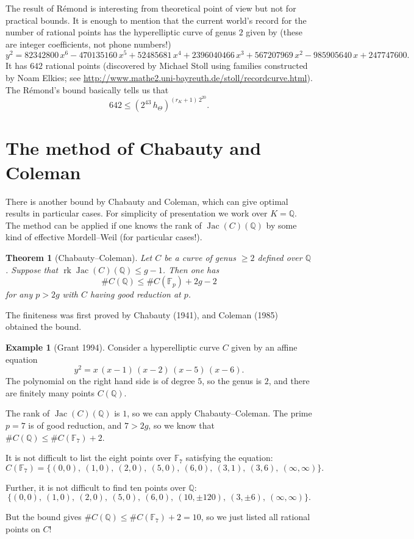 \documentclass{article}
\newtheorem{theorem}[proposition]{Theorem}
\theoremstyle{definition}
\newtheorem{example}[proposition]{Example}
\DeclareMathOperator{\rk}{rk}
\DeclareMathOperator{\Jac}{Jac}
\newcommand{\FF}{\mathbb{F}}
\newcommand{\QQ}{\mathbb{Q}}
\begin{document}
The result of R\'emond is interesting from theoretical point of view but not for
practical bounds. It is enough to mention that the current world's record for
the number of rational points has the hyperelliptic curve of genus $2$ given by
(these are integer coefficients, not phone numbers!)
$$y^2 = 82342800\,x^6 - 470135160\,x^5 + 52485681\,x^4 + 2396040466\,x^3 + 567207969\,x^2 - 985905640\,x + 247747600.$$
It has $642$ rational points (discovered by Michael Stoll using families
constructed by Noam Elkies; see
\url{http://www.mathe2.uni-bayreuth.de/stoll/recordcurve.html}).  The R\'emond's
bound basically tells us that
$$642 \le (2^{43}\,h_\Theta)^{(r_K+1)\,2^{20}}.$$

\section{The method of Chabauty and Coleman}

There is another bound by Chabauty and Coleman, which can give optimal results
in particular cases. For simplicity of presentation we work over $K = \QQ$. The
method can be applied if one knows the rank of $\Jac (C) (\QQ)$ by some kind of
effective Mordell--Weil (for particular cases!).

\begin{theorem}[Chabauty--Coleman]
  Let $C$ be a curve of genus $\ge 2$ defined over $\QQ$. Suppose that
  $\rk \Jac (C) (\QQ) \le g-1$. Then one has
  $$\# C (\QQ) \le \# C (\FF_p) + 2g - 2$$
  for any $p > 2g$ with $C$ having good reduction at $p$.
\end{theorem}

The finiteness was first proved by Chabauty (1941), and Coleman (1985) obtained
the bound.

\begin{example}[Grant 1994]
  Consider a hyperelliptic curve $C$ given by an affine equation
  $$y^2 = x\,(x-1)\,(x-2)\,(x-5)\,(x-6).$$
  The polynomial on the right hand side is of degree $5$, so the genus is $2$,
  and there are finitely many points $C (\QQ)$.

  The rank of $\Jac (C) (\QQ)$ is $1$, so we can apply Chabauty--Coleman. The
  prime $p = 7$ is of good reduction, and $7 > 2g$, so we know that
  $\# C (\QQ) \le \# C (\FF_7) + 2$.

  It is not difficult to list the eight points over $\FF_7$ satisfying the
  equation:
  $$C (\FF_7) = \{ (0,0), ~ (1,0), ~ (2,0), ~ (5,0), ~ (6,0), ~ (3,1), ~ (3,6), ~ (\infty,\infty) \}.$$

  Further, it is not difficult to find ten points over $\QQ$:
  $$\{ (0,0), ~ (1,0), ~ (2,0), ~ (5,0), ~ (6,0), ~ (10, \pm 120), ~ (3,\pm 6), ~ (\infty,\infty) \}.$$

  But the bound gives $\# C (\QQ) \le \# C (\FF_7) + 2 = 10$, so we just listed
  all rational points on $C$!
\end{example}
\end{document}

